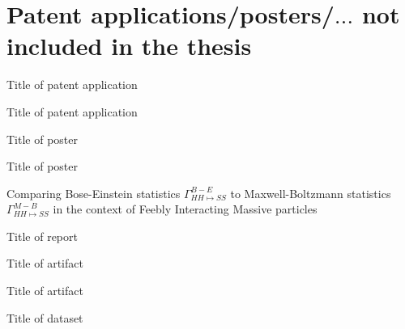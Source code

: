 \documentclass[
English,                 %
includepublications,    %
%
%
%
%
%
%
%
%
%
%
%
%
%
%
%
%
%
%
]{kththesis}
\begin{document}
    \section*{Patent applications/posters/$\ldots$ not included in the thesis}
    {\FigtreeFont\fontsize{11}{13}\selectfont
    \begin{ListOfPatentApplications}
        \item \label{patentApplication:A} Title of patent application
        \item \label{patentApplication:B} Title of patent application
    \end{ListOfPatentApplications}

    \begin{ListOfPosters}
        \item \label{poster:A} Title of poster
        \item \label{poster:B} Title of poster
    \end{ListOfPosters}

    \begin{ListOfReports}
        \item \label{report:A} Comparing Bose-Einstein statistics $\Gamma^{B-E}_{HH\mapsto SS}$ to Maxwell-Boltzmann statistics $\Gamma^{M-B}_{HH\mapsto SS}$ in the context of Feebly Interacting Massive particles %
        \item \label{report:B} Title of report
    \end{ListOfReports}

    \begin{ListOfArtifacts}
        \item \label{artifact:B} Title of artifact
        \item \label{artifact:C} Title of artifact
    \end{ListOfArtifacts}
    
    \begin{ListOfDatasets}
        \item \label{dataset:A} Title of dataset
    \end{ListOfDatasets}
    } %

\fi %

\end{document}
